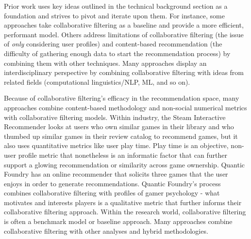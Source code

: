 \documentclass[10pt,twocolumn]{article}
\begin{document}
\begin{comment}
            "The main aim of this paper is to understandthe content of the movie plot using a word embedding to improve the measurementof similarity of each plot content to other plot content (called plot embedding"

            Nguyen et al. - https://onlinelibrary.wiley.com/doi/pdf/10.1002/cpe.6232 - cited

            Use contextual information to improve RS accuracy. Propose new context-aware RS extracting context from reviews using a word embedding model - use this in addition to user profiles to get context sensitivity, tested on Yelp dataset

            Sundermann et al.
            https://ieeexplore.ieee.org/stamp/stamp.jsp?arnumber=8609619 - cited

    
\end{comment}

Prior work uses key ideas outlined in the technical background section as a foundation and strives to pivot and iterate upon them. For instance, some approaches take collaborative filtering as a baseline and provide a more efficient, performant model. Others address limitations of collaborative filtering (the issue of \textit{only} considering user profiles) and content-based recommendation (the difficulty of gathering enough data to start the recommendation process) by combining them with other techniques. Many approaches display an interdisciplinary perspective by combining collaborative filtering with ideas from related fields (computational linguistics/NLP, ML, and so on).

Because of collaborative filtering's efficacy in the recommendation space, many approaches combine content-based methodology and non-social numerical metrics with collaborative filtering models. Within industry, the Steam Interactive Recommender \cite{SteamInteractiveRecommender} looks at users who own similar games in their library and who thumbed up similar games in their review catalog to recommend games, but it also uses quantitative metrics like user play time. Play time is an objective, non-user profile metric that nonetheless is an informatic factor that can further support a glowing recommendation or similarity across game ownership. Quantic Foundry \cite{QuanticFoundryRecommender} has an online recommender that solicits three games that the user enjoys in order to generate recommendations. Quantic Foundry's process combines collaborative filtering with profiles of gamer psychology - what motivates and interests players is a qualitative metric that further informs their collaborative filtering approach. Within the research world, collaborative filtering is often a benchmark model or baseline approach. Many approaches combine collaborative filtering with other analyses and hybrid methodologies. \cite{Choi, Gohari, PerezMarcos}
\end{document}
